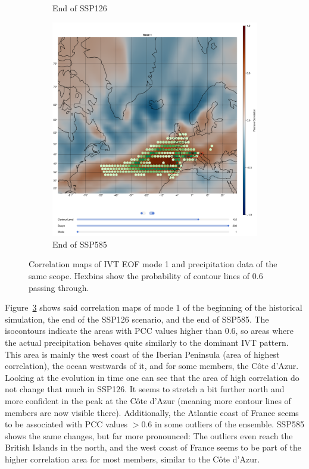 \begin{figure}[!htb]
\begin{subfigure}[b]{0.32\textwidth}
    \caption{End of SSP126} 
    \label{fig:ivt eof pr cor ssp126 mode1}
  \end{subfigure}
  \begin{subfigure}[b]{0.32\textwidth}
    \includegraphics[width=\textwidth]{figures/ivt_pr_cor_mode1_ssp585_hexbin.png}
    \caption{End of SSP585}
    \label{fig:ivt eof pr cor ssp585 mode1}
  \end{subfigure}
  \caption{Correlation maps of IVT EOF mode 1 and precipitation data of the same scope. Hexbins show the probability of contour lines of $0.6$ passing through.}
  \label{fig:ivt eof pr cor mode1}
\end{figure}


Figure~\ref{fig:ivt eof pr cor mode1} shows said correlation maps of mode 1 of the beginning of the historical simulation, the end of the SSP126 scenario, and the end of SSP585. 
The isocontours indicate the areas with PCC values higher than $0.6$, so areas where the actual precipitation behaves quite similarly to the dominant IVT pattern. 
This area is mainly the west coast of the Iberian Peninsula (area of highest correlation), the ocean westwards of it, and for some members, the Côte d'Azur. 
Looking at the evolution in time one can see that the area of high correlation do not change that much in SSP126. 
It seems to stretch a bit further north and more confident in the peak at the Côte d'Azur (meaning more contour lines of members are now visible there). 
Additionally, the Atlantic coast of France seems to be associated with PCC values $>0.6$ in some outliers of the ensemble. 
SSP585 shows the same changes, but far more pronounced: The outliers even reach the British Islands in the north, and the west coast of France seems to be part of the higher correlation area for most members, similar to the Côte d'Azur.


